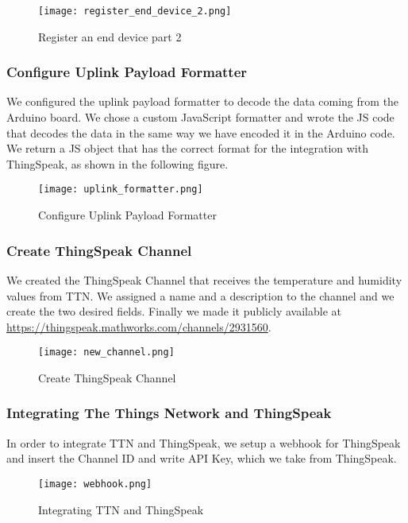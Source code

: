 \begin{figure}[H]
    \centering
    \texttt{[image: register\_end\_device\_2.png]}
    \caption{Register an end device part 2}
\end{figure}

\subsubsection{Configure Uplink Payload Formatter}
We configured the uplink payload formatter to decode the data coming from the Arduino board. We chose a custom JavaScript formatter and wrote the JS code that decodes the data in the same way we have encoded it in the Arduino code. We return a JS object that has the correct format for the integration with ThingSpeak, as shown in the following figure.

\begin{figure}[H]
    \centering
    \texttt{[image: uplink\_formatter.png]}
    \caption{Configure Uplink Payload Formatter}
\end{figure}

\subsubsection{Create ThingSpeak Channel}
We created the ThingSpeak Channel that receives the temperature and humidity values from TTN. We assigned a name and a description to the channel and we create the two desired fields. Finally we made it publicly available at {\color{blue}\url{https://thingspeak.mathworks.com/channels/2931560}}.

\begin{figure}[H]
    \centering
    \texttt{[image: new\_channel.png]}
    \caption{Create ThingSpeak Channel}
\end{figure}

\subsubsection{Integrating The Things Network and ThingSpeak}
In order to integrate TTN and ThingSpeak, we setup a webhook for ThingSpeak and insert the Channel ID and write API Key, which we take from ThingSpeak.

\begin{figure}[H]
    \centering
    \texttt{[image: webhook.png]}
    \caption{Integrating TTN and ThingSpeak}
\end{figure}

